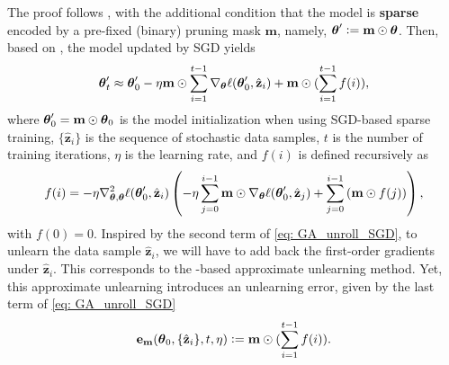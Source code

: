 {The proof follows  \cite[Sec.\,5]{thudi2021unrolling}, with the additional condition that the model is \textbf{sparse} encoded by a pre-fixed (binary) pruning mask $\mathbf m$, namely,
$\boldsymbol{\theta}^\prime \mathrel{\mathop:}= \mathbf m \odot \boldsymbol{\theta}$.} 
Then, based on \cite[Eq.\,5]{thudi2021unrolling}, the model updated by SGD yields  
\begin{align}
    \btheta_t^\prime \approx  \btheta_0^\prime - \eta \mathbf m \odot \sum_{i=1}^{t-1}\nabla_{\btheta} \ell (\btheta_0^\prime, \hat{\mathbf z}_i) + %
    \mathbf m \odot (\sum_{i=1}^{t-1} f(i)),
  \label{eq: GA_unroll_SGD}
 \end{align} 
where $\boldsymbol{\theta}_0^\prime = \mathbf m \odot \boldsymbol{\theta}_0$ is the  model initialization when using SGD-based sparse training,    $\{ \hat{\mathbf z}_i \}$
is the sequence of stochastic data samples, $t$ is the number of training iterations, $\eta$ is the learning rate,  and 
 $f(i)$ is defined recursively as 
\begin{align}
    f(i) = -\eta \nabla^2_{\boldsymbol{\theta}, \boldsymbol{\theta}} \ell (\boldsymbol{\theta}_0^\prime, \hat{\mathbf z}_i) \left( -\eta \sum_{j=0}^{i-1} {{ \mathbf m \odot \nabla_{\boldsymbol{\theta}} \ell (\boldsymbol{\theta}_0^\prime, \hat{\mathbf z}_j) }} + \sum_{j=0}^{i-1} {{( \mathbf m \odot f(j))}} \right),
    \label{eq: f_i_unroll_SGD}
\end{align}
with $f(0) = 0$. 
Inspired by the second term of \eqref{eq: GA_unroll_SGD}, to unlearn the data sample $\hat{\mathbf z}_i$, we will have   to   add back the first-order gradients under $\hat{\mathbf z}_i$. This corresponds to the {\GA}-based approximate unlearning method. Yet, this approximate unlearning introduces an unlearning error, given by the last term of \eqref{eq: GA_unroll_SGD}
\begin{align}
\mathbf e_{\mathbf m}(  \boldsymbol{\theta}_0, \{ \hat{\mathbf z}_i \},  t, \eta) \mathrel{\mathop:}=       \mathbf m \odot (\sum_{i=1}^{t-1} f(i)). 
     \label{eq: unlearn_err_sparse}
\end{align}



